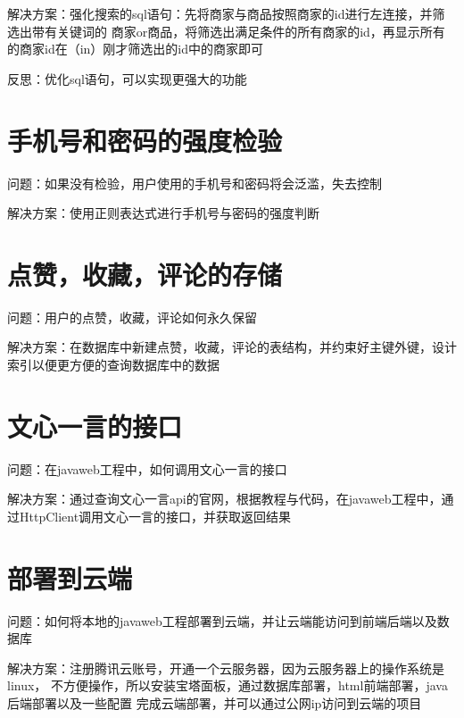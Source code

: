 解决方案：强化搜索的sql语句：先将商家与商品按照商家的id进行左连接，并筛选出带有关键词的
商家or商品，将筛选出满足条件的所有商家的id，再显示所有的商家id在（in）刚才筛选出的id中的商家即可

反思：优化sql语句，可以实现更强大的功能

\section{手机号和密码的强度检验}
问题：如果没有检验，用户使用的手机号和密码将会泛滥，失去控制

解决方案：使用正则表达式进行手机号与密码的强度判断

\section{点赞，收藏，评论的存储}

问题：用户的点赞，收藏，评论如何永久保留

解决方案：在数据库中新建点赞，收藏，评论的表结构，并约束好主键外键，设计索引以便更方便的查询数据库中的数据

\section{文心一言的接口}

问题：在javaweb工程中，如何调用文心一言的接口

解决方案：通过查询文心一言api的官网，根据教程与代码，在javaweb工程中，通过HttpClient调用文心一言的接口，并获取返回结果

\section{部署到云端}

问题：如何将本地的javaweb工程部署到云端，并让云端能访问到前端后端以及数据库

解决方案：注册腾讯云账号，开通一个云服务器，因为云服务器上的操作系统是linux，
不方便操作，所以安装宝塔面板，通过数据库部署，html前端部署，java后端部署以及一些配置
完成云端部署，并可以通过公网ip访问到云端的项目
